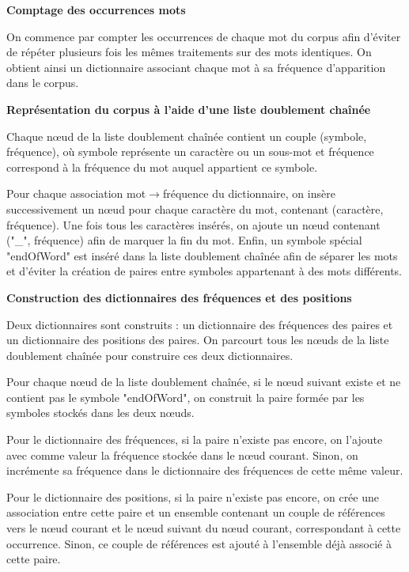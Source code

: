 \documentclass[12pt,a4paper]{report}
\begin{document}
	\begin{enumerateFB}
		\item \textbf{Comptage des occurrences mots}
		
		On commence par compter les occurrences de chaque mot du corpus afin d’éviter de répéter plusieurs fois les mêmes traitements sur des mots identiques. On obtient ainsi un dictionnaire associant chaque mot à sa fréquence d’apparition dans le corpus.
		
		\item \textbf{Représentation du corpus à l’aide d’une liste doublement chaînée}
		
		Chaque nœud de la liste doublement chaînée contient un couple (symbole, fréquence), où symbole représente un caractère ou un sous-mot et fréquence correspond à la fréquence du mot auquel appartient ce symbole.
		
		Pour chaque association mot$\rightarrow$fréquence du dictionnaire, on insère successivement un nœud pour chaque caractère du mot, contenant (caractère, fréquence). Une fois tous les caractères insérés, on ajoute un nœud contenant ("\_", fréquence) afin de marquer la fin du mot. Enfin, un symbole spécial "endOfWord" est inséré dans la liste doublement chaînée afin de séparer les mots et d’éviter la création de paires entre symboles appartenant à des mots différents.
		
		\item \textbf{Construction des dictionnaires des fréquences et des positions}
		
		Deux dictionnaires sont construits : un dictionnaire des fréquences des paires et un dictionnaire des positions des paires. On parcourt tous les nœuds de la liste doublement chaînée pour construire ces deux dictionnaires.
		
		Pour chaque nœud de la liste doublement chaînée, si le nœud suivant existe et ne contient pas le symbole "endOfWord", on construit la paire formée par les symboles stockés dans les deux nœuds.
		
		Pour le dictionnaire des fréquences, si la paire n’existe pas encore, on l’ajoute avec comme valeur la fréquence stockée dans le nœud courant. Sinon, on incrémente sa fréquence dans le dictionnaire des fréquences de cette même valeur.
		
		Pour le dictionnaire des positions, si la paire n’existe pas encore, on crée une association entre cette paire et un ensemble contenant un couple de références vers le nœud courant et le nœud suivant du nœud courant, correspondant à cette occurrence. Sinon, ce couple de références est ajouté à l’ensemble déjà associé à cette paire. 
		

\end{enumerateFB}
\end{document}
